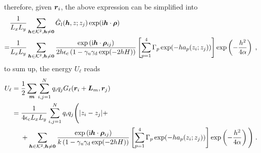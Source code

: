 therefore, given $\bm{r}_i$, the above expression can be simplified into
\begin{align*}
 &\frac{1}{ L_xL_y}   \sum_{\boldsymbol{h}\in\mathcal{K}^2,\boldsymbol{h}\neq\bm{0}} \Hat{G}_l(\boldsymbol{h},z;z_j)\exp(\textrm{i}\boldsymbol{h}\cdot \bm{\rho})\\
 =& \frac{1}{ L_xL_y}   \sum_{\boldsymbol{h}\in\mathcal{K}^2,\boldsymbol{h}\neq\bm{0}} \frac{ \exp{(\mathrm{i} \boldsymbol{h} \cdot \boldsymbol{\rho}_{ij})}}{2h\epsilon_{\mathrm{c}}\left(1-\gamma_{\mathrm{u}}\gamma_{\mathrm{d}}\exp(-2hH)\right)}\left[\sum_{p=1}^4\Gamma_p\exp(-ha_p(z_i;z_j))\right] \exp\left(-\frac{h^2}{4\alpha}\right)\;,
\end{align*}
to sum up, the energy $U_\ell$ reads
\begin{align*}
U_\ell&=\frac{1}{2}\sum_{\bm{m}}\sum_{i,j=1}^N q_iq_j      G_\ell(\boldsymbol{r}_i+\bm{L}_m, \boldsymbol{r}_j)\\
&=\frac{1}{4\epsilon_{\mathrm{c}} L_xL_y}\sum_{i,j=1}^N  q_iq_j \Bigg({\left\lvert z_i-z_j\right\rvert} +\\&~~~~+  \sum_{\boldsymbol{h}\in\mathcal{K}^2,\boldsymbol{h}\neq\bm{0}} \frac{ \exp{(\mathrm{i} \boldsymbol{h} \cdot \boldsymbol{\rho}_{ij})}}{k\left(1-\gamma_{\mathrm{u}}\gamma_{\mathrm{d}}\exp(-2hH)\right)}\left[\sum_{p=1}^4\Gamma_p\exp(-ha_p(z_i;z_j))\right] \exp\left(-\frac{h^2}{4\alpha}\right)\Bigg)\;.
\end{align*}


